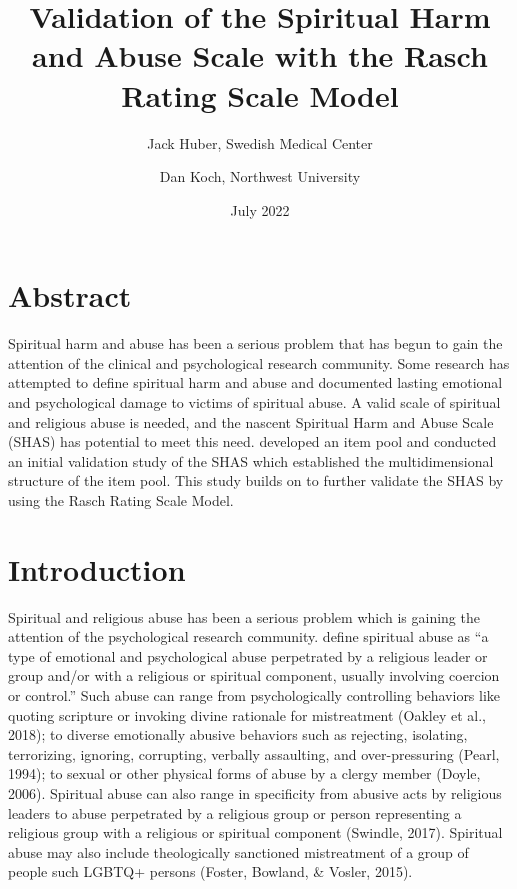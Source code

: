 \documentclass[
]{article}
\title{Validation of the Spiritual Harm and Abuse Scale with the Rasch Rating Scale Model}
\author{Jack Huber, Swedish Medical Center \and Dan Koch, Northwest University}
\date{July 2022}
\begin{document}
\maketitle

\hypertarget{abstract}{%
\section{Abstract}\label{abstract}}

Spiritual harm and abuse has been a serious problem that has begun to gain the attention of the clinical and psychological research community. Some research has attempted to define spiritual harm and abuse and documented lasting emotional and psychological damage to victims of spiritual abuse. A valid scale of spiritual and religious abuse is needed, and the nascent Spiritual Harm and Abuse Scale (SHAS) has potential to meet this need. \citet{KochEdstrom2022} developed an item pool and conducted an initial validation study of the SHAS which established the multidimensional structure of the item pool. This study builds on \citet{KochEdstrom2022} to further validate the SHAS by using the Rasch Rating Scale Model.

\hypertarget{introduction}{%
\section{Introduction}\label{introduction}}

Spiritual and religious abuse has been a serious problem which is gaining the attention of the psychological research community. \citet{KochEdstrom2022} define spiritual abuse as ``a type of emotional and psychological abuse perpetrated by a religious leader or group and/or with a religious or spiritual component, usually involving coercion or control.'' Such abuse can range from psychologically controlling behaviors like quoting scripture or invoking divine rationale for mistreatment (Oakley et al., 2018); to diverse emotionally abusive behaviors such as rejecting, isolating, terrorizing, ignoring, corrupting, verbally assaulting, and over-pressuring (Pearl, 1994); to sexual or other physical forms of abuse by a clergy member (Doyle, 2006). Spiritual abuse can also range in specificity from abusive acts by religious leaders to abuse perpetrated by a religious group or person representing a religious group with a religious or spiritual component (Swindle, 2017). Spiritual abuse may also include theologically sanctioned mistreatment of a group of people such LGBTQ+ persons (Foster, Bowland, \& Vosler, 2015).
\end{document}
